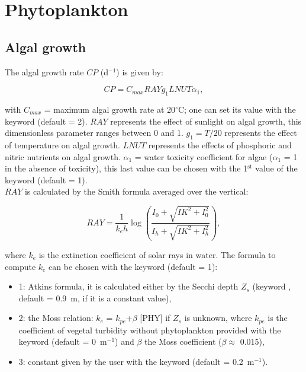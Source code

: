 \section{Phytoplankton}

\subsection{Algal growth}

The algal growth rate $CP$ (d$^{-1}$) is given by:

\begin{equation*}
  CP = C_{max} RAY g_1 LNUT \alpha_1,
\end{equation*}

with $C_{max}$ = maximum algal growth rate at 20$^{\circ}$C;
one can set its value with the keyword  (default = 2).
$RAY$ represents the effect of sunlight on algal growth,
this dimensionless parameter ranges between 0 and 1.
$g_1 = T/20$ represents the effect of temperature on algal growth.
$LNUT$ represents the effects of phosphoric and nitric nutrients on algal growth.
$\alpha_1$ = water toxicity coefficient for algae ($\alpha_1$ = 1 in the absence of toxicity),
this last value can be chosen with the 1$^{\textrm{st}}$ value of the keyword
 (default = 1).\\
$RAY$ is calculated by the Smith formula averaged over the vertical:

\begin{equation*}
  RAY = \frac{1}{k_e h} \log \left( \frac{I_0 + \sqrt{IK^2+I_0^2} }{ I_h + \sqrt{IK^2+I_h^2} }  \right),
\end{equation*}

where $k_e$ is the extinction coefficient of solar rays in water.
The formula to compute $k_e$ can be chosen with the keyword
 (default = 1):
\begin{itemize}
  \item 1: Atkins formula, it is calculated either by the Secchi depth $Z_s$
(keyword , default = 0.9~m, if it is a constant value),
  \item 2: the Moss relation: $k_e$ = $k_{pe}$+$ \beta $ [PHY] if $Z_s$ is unknown,
    where $k_{pe}$ is the coefficient of vegetal turbidity without phytoplankton
    provided with the keyword 
    (default = 0~m$^{-1}$)
    and $\beta$ the Moss coefficient ($\beta \approx$ 0.015),
  \item 3: constant given by the user with the keyword
     (default = 0.2~m$^{-1}$).
\end{itemize}


